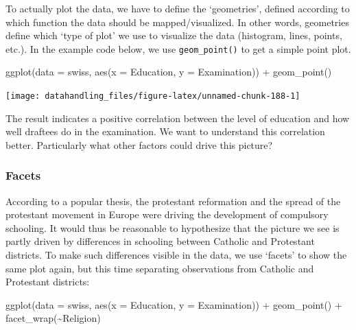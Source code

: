 \documentclass[
  12pt,
]{style/krantz}
\newenvironment{Shaded}{\begin{snugshade}}{\end{snugshade}}
\newcommand{\AttributeTok}[1]{\textcolor[rgb]{0.77,0.63,0.00}{#1}}
\newcommand{\FunctionTok}[1]{\textcolor[rgb]{0.00,0.00,0.00}{#1}}
\newcommand{\NormalTok}[1]{#1}
\newcommand{\SpecialCharTok}[1]{\textcolor[rgb]{0.00,0.00,0.00}{#1}}
\begin{document}
To actually plot the data, we have to define the `geometries', defined according to which function the data should be mapped/visualized. In other words, geometries define which `type of plot' we use to visualize the data (histogram, lines, points, etc.). In the example code below, we use \texttt{geom\_point()} to get a simple point plot.

\begin{Shaded}
\begin{Highlighting}[]
\FunctionTok{ggplot}\NormalTok{(}\AttributeTok{data =}\NormalTok{ swiss, }\FunctionTok{aes}\NormalTok{(}\AttributeTok{x =}\NormalTok{ Education, }\AttributeTok{y =}\NormalTok{ Examination)) }\SpecialCharTok{+}
     \FunctionTok{geom\_point}\NormalTok{()}
\end{Highlighting}
\end{Shaded}

\texttt{[image: datahandling\_files/figure-latex/unnamed-chunk-188-1]}

The result indicates a positive correlation between the level of education and how well draftees do in the examination. We want to understand this correlation better. Particularly what other factors could drive this picture?

\hypertarget{facets}{%
\subsubsection{Facets}\label{facets}}

According to a popular thesis, the protestant reformation and the spread of the protestant movement in Europe were driving the development of compulsory schooling. It would thus be reasonable to hypothesize that the picture we see is partly driven by differences in schooling between Catholic and Protestant districts. To make such differences visible in the data, we use `facets' to show the same plot again, but this time separating observations from Catholic and Protestant districts:

\begin{Shaded}
\begin{Highlighting}[]
\FunctionTok{ggplot}\NormalTok{(}\AttributeTok{data =}\NormalTok{ swiss, }\FunctionTok{aes}\NormalTok{(}\AttributeTok{x =}\NormalTok{ Education, }\AttributeTok{y =}\NormalTok{ Examination)) }\SpecialCharTok{+}
     \FunctionTok{geom\_point}\NormalTok{() }\SpecialCharTok{+}
     \FunctionTok{facet\_wrap}\NormalTok{(}\SpecialCharTok{\textasciitilde{}}\NormalTok{Religion)}
\end{Highlighting}
\end{Shaded}
\end{document}
